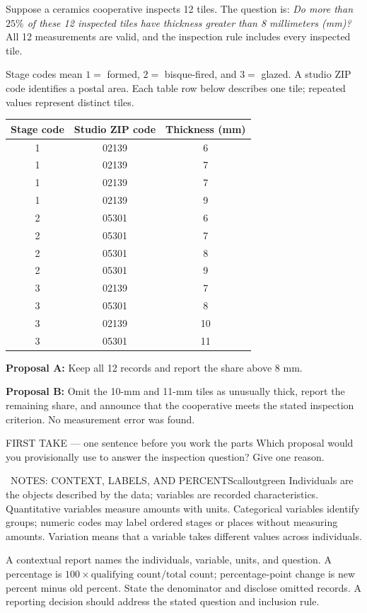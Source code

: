 \documentclass[11pt]{article}
\begin{document}
Suppose a ceramics cooperative inspects 12 tiles. The question is: \emph{Do more than $25\%$ of these 12 inspected tiles have thickness greater than 8 millimeters (mm)?} All 12 measurements are valid, and the inspection rule includes every inspected tile.\par\smallskip
Stage codes mean $1=$ formed, $2=$ bisque-fired, and $3=$ glazed. A studio ZIP code identifies a postal area. Each table row below describes one tile; repeated values represent distinct tiles.
\begin{center}\begin{tabular}{ccc}\hline
\textbf{Stage code} & \textbf{Studio ZIP code} & \textbf{Thickness (mm)} \\\hline
1 & 02139 & 6 \\
1 & 02139 & 7 \\
1 & 02139 & 7 \\
1 & 02139 & 9 \\
2 & 05301 & 6 \\
2 & 05301 & 7 \\
2 & 05301 & 8 \\
2 & 05301 & 9 \\
3 & 02139 & 7 \\
3 & 05301 & 8 \\
3 & 02139 & 10 \\
3 & 05301 & 11 \\\hline
\end{tabular}\end{center}
\textbf{Proposal A:} Keep all 12 records and report the share above 8 mm.\par
\textbf{Proposal B:} Omit the 10-mm and 11-mm tiles as unusually thick, report the remaining share, and announce that the cooperative meets the stated inspection criterion. No measurement error was found.\par
\begin{firsttakebox}{FIRST TAKE --- one sentence before you work the parts}
Which proposal would you provisionally use to answer the inspection question? Give one reason.\par
{}
\end{firsttakebox}

\begin{callout}{\IconBook\ NOTES: CONTEXT, LABELS, AND PERCENTS}{calloutgreen}
Individuals are the objects described by the data; variables are recorded characteristics. Quantitative variables measure amounts with units. Categorical variables identify groups; numeric codes may label ordered stages or places without measuring amounts. Variation means that a variable takes different values across individuals.\par A contextual report names the individuals, variable, units, and question. A percentage is $100\times\text{qualifying count}/\text{total count}$; percentage-point change is new percent minus old percent. State the denominator and disclose omitted records. A reporting decision should address the stated question and inclusion rule.
\end{callout}
\end{document}

